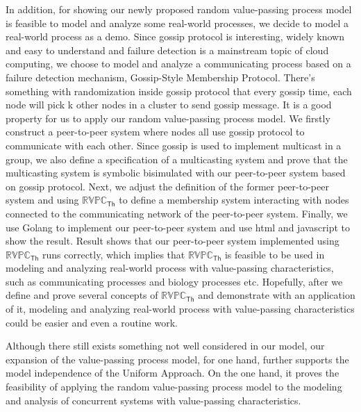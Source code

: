 \begin{digest}
  In addition, for showing our newly proposed random value-passing process model is feasible to model and analyze some real-world processes, we decide to model a real-world process as a demo. Since gossip protocol is interesting, widely known and easy to understand and failure detection is a mainstream topic of cloud computing, we choose to model and analyze a communicating process based on a failure detection mechanism, Gossip-Style Membership Protocol. There’s something with randomization inside gossip protocol that every gossip time, each node will pick k other nodes in a cluster to send gossip message. It is a good property for us to apply our random value-passing process model. We firstly construct a peer-to-peer system where nodes all use gossip protocol to communicate with each other. Since gossip is used to implement multicast in a group, we also define a specification of a multicasting system and prove that the multicasting system is symbolic bisimulated with our peer-to-peer system based on gossip protocol. Next, we adjust the definition of the former peer-to-peer system and using $\mathbb{RVPC}_{\mathsf{Th}}$ to define a membership system interacting with nodes connected to the communicating network of the peer-to-peer system. Finally, we use Golang to implement our peer-to-peer system and use html and javascript to show the result. Result shows that our peer-to-peer system implemented using $\mathbb{RVPC}_{\mathsf{Th}}$ runs correctly, which implies that $\mathbb{RVPC}_{\mathsf{Th}}$ is feasible to be used in modeling and analyzing real-world process with value-passing characteristics, such as communicating processes and biology processes etc. Hopefully, after we define and prove several concepts of $\mathbb{RVPC}_{\mathsf{Th}}$ and demonstrate with an application of it, modeling and analyzing real-world process with value-passing characteristics could be easier and even a routine work.

  Although there still exists something not well considered in our model, our expansion of the value-passing process model, for one hand, further supports the model independence of the Uniform Approach. On the one hand, it proves the feasibility of applying the random value-passing process model to the modeling and analysis of concurrent systems with value-passing characteristics.

\end{digest}
